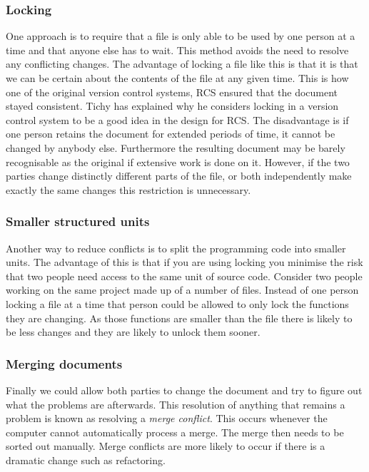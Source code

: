 \subsubsection{Locking}
One approach is to require that a file is only able to be used by one person at a time and that anyone else has to wait. This method avoids the need to resolve any conflicting changes.  The advantage of locking a file like this is that it is that we can be certain about the contents of the file at any given time. This is how one of the original version control systems, RCS ensured that the document stayed consistent. Tichy \cite{Tichy1982} has explained why he considers locking in a version control system to be a good idea in the design for RCS. The disadvantage is if one person retains the document for extended periods of time, it cannot be changed by anybody else. Furthermore the resulting document may be barely recognisable as the original if extensive work is done on it. However, if the two parties change distinctly different parts of the file, or both independently make exactly the same changes this restriction is unnecessary. 
\subsubsection{Smaller structured units}
Another way to reduce conflicts is to split the programming code into smaller units.  The advantage of this is that if you are using locking you minimise the risk that two people need access to the same unit of source code. Consider two people working on the same project made up of a number of files.  Instead of one person locking a file at a time that person could be allowed to only lock the functions they are changing. As those functions are smaller than the file there is likely to be less changes and they are likely to unlock them sooner.
\subsubsection{Merging documents}
Finally we could allow both parties to change the document and try to figure out what the problems are afterwards.  This resolution of anything that remains a problem is known as resolving a \emph{merge conflict}. This occurs whenever the computer cannot automatically process a merge.  The merge then needs to be sorted out manually. Merge conflicts are more likely to occur if there is a dramatic change such as refactoring.

